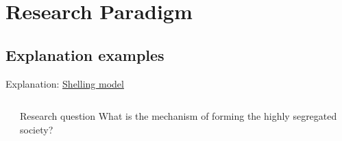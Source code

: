 \documentclass[compress]{beamer}
\begin{document}
\section{Research Paradigm}
\subsection{Explanation examples}
\begin{frame}{Explanation: \href{https://github.com/CinkerZX/BasicNetLogoSimModels}{Shelling model\cite{schelling1971dynamic}}}

    \begin{columns}[c]
        \begin{column}{.4\textwidth}
            \centering
        \end{column}
        \begin{column}{.5\textwidth}
            \raggedright
            \begin{minipage}{5.8cm}
                \begin{block}{Research question}
                    What is the mechanism of forming the highly segregated society?

\end{block}
\end{minipage}
\end{column}
\end{columns}
\end{frame}
\end{document}
